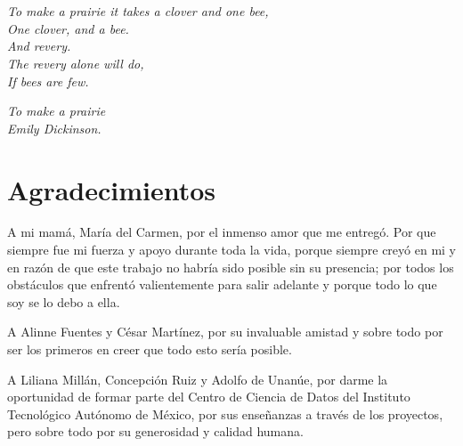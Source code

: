 \documentclass[11pt, oneside]{book}
\begin{document}

\pagestyle{plain}

\chapter*{}

\begin{flushright}
\textit{To make a prairie it takes a clover and one bee, \\ 
One clover, and a bee. \\ 
And revery. \\ 
The revery alone will do, \\ 
If bees are few.}
\end{flushright}

\vspace{0.5 cm}

\begin{flushright}
\textit{To make a prairie \\ Emily Dickinson.}
\end{flushright}


\chapter*{Agradecimientos}

\noindent  A mi mamá, María del Carmen, por el inmenso amor que me entregó. Por que siempre fue mi fuerza y apoyo durante toda la vida, porque siempre creyó en mi y en razón de que este trabajo no habría sido posible sin su presencia; por todos los obstáculos que enfrentó valientemente para salir adelante y porque todo lo que soy se lo debo a ella.

\vspace{0.5cm}

A Alinne Fuentes y César Martínez, por su invaluable amistad y sobre todo por ser los primeros en creer que todo esto sería posible.

\vspace{0.5cm}

A Liliana Millán, Concepción Ruiz y Adolfo de Unanúe, por darme la oportunidad de formar parte del Centro de Ciencia de Datos del Instituto Tecnológico Autónomo de México, por sus enseñanzas a través de los proyectos, pero sobre todo por su generosidad y calidad humana.
\end{document}
